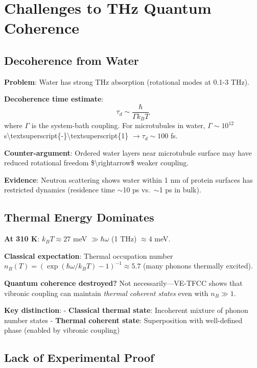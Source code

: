 \section{Challenges to THz Quantum
Coherence}\label{challenges-to-thz-quantum-coherence}

\subsection{Decoherence from Water}\label{decoherence-from-water}

\textbf{Problem}: Water has strong THz absorption (rotational modes at
0.1-3 THz).

\textbf{Decoherence time estimate}:
\[\tau_d \sim \frac{\hbar}{\Gamma k_B T}\] where \(\Gamma\) is the
system-bath coupling. For microtubules in water, \(\Gamma \sim 10^{12}\)
s\textbackslash textsuperscript\{-\}\textbackslash textsuperscript\{1\}
\(\rightarrow \tau_d \sim 100\) fs.

\textbf{Counter-argument}: Ordered water layers near microtubule surface
may have reduced rotational freedom \$\textbackslash rightarrow\$ weaker
coupling.

\textbf{Evidence}: Neutron scattering shows water within 1 nm of protein
surfaces has restricted dynamics (residence time $\sim$10 ps
vs.~$\sim$1 ps in bulk).

\subsection{Thermal Energy
Dominates}\label{thermal-energy-dominates}

\textbf{At 310 K}: \(k_B T \approx 27\) meV \(\gg \hbar \omega\) (1 THz)
\(\approx 4\) meV.

\textbf{Classical expectation}: Thermal occupation number
\(n_B(T) = (\exp(\hbar \omega / k_B T) - 1)^{-1} \approx 5.7\) (many
phonons thermally excited).

\textbf{Quantum coherence destroyed?} Not necessarily---VE-TFCC
shows that vibronic coupling can maintain \emph{thermal coherent states}
even with \(n_B \gg 1\).

\textbf{Key distinction}: - \textbf{Classical thermal state}: Incoherent
mixture of phonon number states - \textbf{Thermal coherent state}:
Superposition with well-defined phase (enabled by vibronic coupling)

\subsection{Lack of Experimental
Proof}\label{lack-of-experimental-proof}

